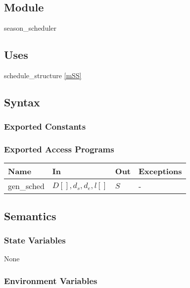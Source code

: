 \documentclass[12pt, titlepage]{article}
\begin{document}


\subsection{Module}

season\_scheduler

\subsection{Uses}

schedule\_structure \ref{mSS}

\subsection{Syntax}

\subsubsection{Exported Constants}

\subsubsection{Exported Access Programs}

\begin{center}
\begin{tabular}{p{2cm} p{4cm} p{4cm} p{2cm}}
\hline
\textbf{Name} & \textbf{In} & \textbf{Out} & \textbf{Exceptions} \\
\hline
gen\_sched & $D[], d_s, d_e, l[]$ & $S$ & - \\
\hline
\end{tabular}
\end{center}

\subsection{Semantics}

\subsubsection{State Variables}

None

\subsubsection{Environment Variables}
\end{document}
